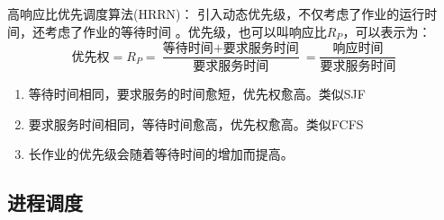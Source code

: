 \documentclass{article}
\begin{document}
高响应比优先调度算法(HRRN)：
{\color{red}引入动态优先级，不仅考虑了作业的运行时间，还考虑了作业的等待时间}
。优先级，也可以叫响应比$R_P$，可以表示为：
\[\text{优先权}=R_P=\frac{\text{等待时间}+\text{要求服务时间}}{\text{要求服务时间}}=\frac{\text{响应时间}}{\text{要求服务时间}}\]
\begin{enumerate}
    \item 等待时间相同，要求服务的时间愈短，优先权愈高。类似SJF
    \item 要求服务时间相同，等待时间愈高，优先权愈高。类似FCFS
    \item 长作业的优先级会随着等待时间的增加而提高。
\end{enumerate}

\subsection{进程调度}
\end{document}
